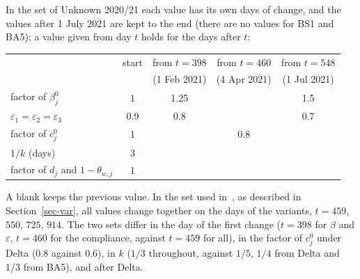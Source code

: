 \documentclass[11pt]{article}
\theoremstyle{remark}
\begin{document}
In the set of Unknown 2020/21 each value has its own days of change, and the values after
1 July 2021 are kept to the end (there are no values for BS1 and BA5); a value given
from day $t$ holds for the days after $t$:
\begin{center}
\small
\begin{tabular}{lcccc}
 & start & from $t=398$ & from $t=460$ & from $t=548$\\
 & & (1 Feb 2021) & (4 Apr 2021) & (1 Jul 2021)\\\hline
factor of $\beta_j^0$ & 1 & 1.25 & & 1.5\\
$\varepsilon_1=\varepsilon_2=\varepsilon_3$ & 0.9 & 0.8 & & 0.7\\
factor of $c_j^0$ & 1 & & 0.8 & \\
$1/k$ (days) & 3 & & & \\
factor of $d_j$ and $1-\theta_{w,j}$ & 1 & & &
\end{tabular}
\end{center}
A blank keeps the previous value. In the set used in~\cite{2026Feng_Day_Glasser}, as
described in Section~\ref{sec-var}, all values change together on the days of the variants,
$t=459$, $550$, $725$, $914$. The two sets differ in the day of the first change ($t=398$
for $\beta$ and $\varepsilon$, $t=460$ for the compliance, against $t=459$ for all), in
the factor of $c_j^0$ under Delta (0.8 against 0.6), in $k$ ($1/3$ throughout, against
$1/5$, $1/4$ from Delta and $1/3$ from BA5), and after Delta.



\end{document}
